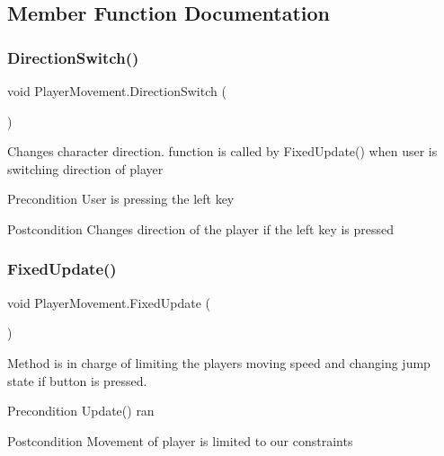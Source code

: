 \subsection{Member Function Documentation}
\mbox{\label{class_player_movement_aea65f5f7247feb09772da2543c8ec427}} 
\subsubsection{\texorpdfstring{Direction\+Switch()}{DirectionSwitch()}}
{\footnotesize\ttfamily void Player\+Movement.\+Direction\+Switch (\begin{DoxyParamCaption}{ }\end{DoxyParamCaption})\hspace{0.3cm}{\ttfamily [inline]}}

Changes character direction. function is called by Fixed\+Update() when user is switching direction of player \begin{DoxyPrecond}{Precondition}
User is pressing the left key 
\end{DoxyPrecond}
\begin{DoxyPostcond}{Postcondition}
Changes direction of the player if the left key is pressed 
\end{DoxyPostcond}
\mbox{\label{class_player_movement_a0caaa871b9ef680c9f02bd0e22c77db1}} 
\subsubsection{\texorpdfstring{Fixed\+Update()}{FixedUpdate()}}
{\footnotesize\ttfamily void Player\+Movement.\+Fixed\+Update (\begin{DoxyParamCaption}{ }\end{DoxyParamCaption})\hspace{0.3cm}{\ttfamily [inline]}}

Method is in charge of limiting the players moving speed and changing jump state if button is pressed. \begin{DoxyPrecond}{Precondition}
Update() ran 
\end{DoxyPrecond}
\begin{DoxyPostcond}{Postcondition}
Movement of player is limited to our constraints 
\end{DoxyPostcond}
\mbox{\label{class_player_movement_abf3660ca2b1a352b4a9da98437c61aa3}} 
